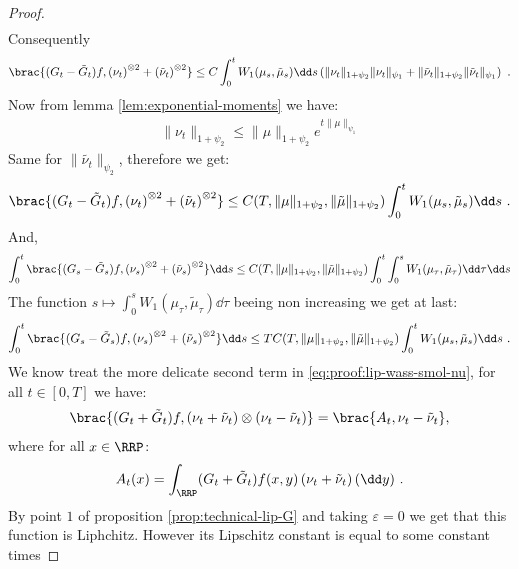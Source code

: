 \begin{proof}
\begin{align*}
    \end{align*}
    Consequently 
    \begin{align*}
        \brac{(G_t - \tilde{G}_t)f, \left(\nu_t\right)^{\otimes 2} + \left(\tilde{\nu}_t\right)^{\otimes 2}} \leq C\int_0^t W_1(\mu_s,\tilde{\mu}_s) \dd s \left(\|\nu_t\|_{1 + \psi_2}\|\nu_t\|_{\psi_1} + \|\tilde{\nu}_t\|_{1 + \psi_2}\|\tilde{\nu}_t\|_{\psi_1}\right)\ .
    \end{align*}
    Now from lemma \ref{lem:exponential-moments} we have:
    \begin{align*}
        \|\nu_t\|_{1 + \psi_2} \leq \|\mu\|_{1 + \psi_2}e^{t\|\mu\|_{\psi_1}}
    \end{align*}
    Same for $\|\tilde{\nu_t}\|_{\psi_2}$, therefore we get:
    \begin{align*}
        \brac{(G_t - \tilde{G}_t)f, \left(\nu_t\right)^{\otimes 2} + \left(\tilde{\nu}_t\right)^{\otimes 2}} \leq C(T,\|\mu\|_{1 + \psi_2},\|\tilde{\mu}\|_{1 + \psi_2})\int_0^t W_1(\mu_s,\tilde{\mu}_s) \dd s\ .
    \end{align*}
    And,
    \begin{align*}
        \int_0^t \brac{(G_s - \tilde{G}_s)f, \left(\nu_s\right)^{\otimes 2} + \left(\tilde{\nu}_s\right)^{\otimes 2}}\dd s 
        \leq C(T,\|\mu\|_{1 + \psi_2},\|\tilde{\mu}\|_{1 + \psi_2}) \int_0^t \int_0^s W_1(\mu_\tau,\tilde{\mu}_\tau) \dd \tau \dd s
    \end{align*}
    The function $s \mapsto \int_0^s W_1(\mu_\tau,\tilde{\mu}_\tau) \dd \tau$ beeing non increasing we get at last:
    \begin{align*}
        \int_0^t \brac{(G_s - \tilde{G}_s)f, \left(\nu_s\right)^{\otimes 2} + \left(\tilde{\nu}_s\right)^{\otimes 2}}\dd s\leq TC(T,\|\mu\|_{1 + \psi_2},\|\tilde{\mu}\|_{1 + \psi_2}) \int_0^t W_1(\mu_s,\tilde{\mu}_s) \dd s\ .
    \end{align*}
    We know treat the more delicate second term in \eqref{eq:proof:lip-wass-smol-nu}, for all $t \in [0,T]$ we have:
    \begin{align*}
        \brac{(G_t + \tilde{G}_t)f,\left(\nu_t + \tilde{\nu}_t\right)\otimes\left(\nu_t - \tilde{\nu}_t\right) } = \brac{A_t,\nu_t - \tilde{\nu}_t},
    \end{align*}
    where for all $x \in \RRP$:
    \begin{align*}
        A_t(x) = \int_{\RRP} (G_t + \tilde{G}_t)f(x,y)\left(\nu_t + \tilde{\nu}_t\right)(\dd y)\ .
    \end{align*}
    By point $1$ of proposition \ref{prop:technical-lip-G} and taking $\varepsilon = 0$ we get that this function is Liphchitz. However its Lipschitz constant is equal to some constant times

\end{proof}

